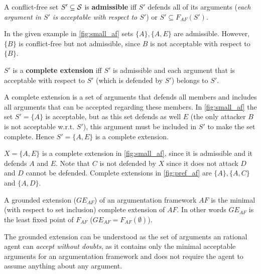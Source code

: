 \begin{definition}
	A conflict-free set $S' \subseteq \S$ is \textbf{admissible} iff $S'$ defends all of its arguments (\textit{each argument in $S'$ is acceptable with respect to $S'$}) or $S' \subseteq F_{AF}(S')$.
\end{definition}

\begin{exa}
In the given example in \autoref{fig:small_af} sets $\{A\}, \{A, E\}$ are admissible. However, $\{B\}$ is conflict-free but not admissible, since $B$ is not acceptable with respect to $\{B\}$.
\end{exa}

\begin{definition}
$S'$ is a \textbf{complete extension} iff  $S'$ is admissible and each argument that is acceptable with respect to $S'$ (which is defended by $S'$) belongs to $S'$.
\end{definition}

\begin{remark}
	A complete extension is a set of arguments that defends all members and includes all arguments that can be accepted regarding these members. In \autoref{fig:small_af} the set $S'=\{A\}$ is acceptable, but as this set defends as well $E$ (the only attacker $B$ is not acceptable w.r.t. $S'$), this argument must be included in $S'$ to make the set complete. Hence $S' = \{A, E\}$ is a complete extension. 
\end{remark}


\begin{exa}
$X = \{A, E\}$ is a complete extension in \autoref{fig:small_af}, since it is admissible and it defends $A$ and $E$. Note that $C$ is not defended by $X$ since it does not attack $D$ and $D$ cannot be defended.
Complete extensions in \autoref{fig:pref_af} are $\{A\}, \{A, C\}$ and $\{A, D\}$.
\end{exa}


\begin{definition}
A grounded extension ($GE_{AF}$) of an argumentation framework $AF$ is the minimal (with respect to set inclusion) complete extension of $AF$. In other words $GE_{AF}$ is the least fixed point of $F_{AF}$ ($GE_{AF} = F_{AF}(\emptyset)$).
\end{definition}

\begin{remark}
	The grounded extension can be understood as the set of arguments an rational agent can \textit{accept without doubts}, as it contains only the minimal acceptable arguments for an argumentation framework and does not require the agent to assume anything about any argument.
\end{remark}


